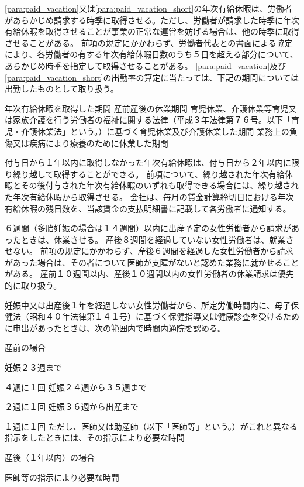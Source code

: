 \documentclass[10pt,a4paper,uplatex]{jsarticle}
\begin{document}
\label{para:paid_vacation_short}
\term
\ref{para:paid_vacation}又は\ref{para:paid_vacation_short}の年次有給休暇は、労働者があらかじめ請求する時季に取得させる。ただし、労働者が請求した時季に年次有給休暇を取得させることが事業の正常な運営を妨げる場合は、他の時季に取得させることがある。
\term
前項の規定にかかわらず、労働者代表との書面による協定により、各労働者の有する年次有給休暇日数のうち５日を超える部分について、あらかじめ時季を指定して取得させることがある。
\term
\ref{para:paid_vacation}及び\ref{para:paid_vacation_short}の出勤率の算定に当たっては、下記の期間については出勤したものとして取り扱う。
\begin{enumerate}
    \itm 年次有給休暇を取得した期間
    \itm 産前産後の休業期間
    \itm 育児休業、介護休業等育児又は家族介護を行う労働者の福祉に関する法律（平成３年法律第７６号。以下「育児・介護休業法」という。）に基づく育児休業及び介護休業した期間
    \itm 業務上の負傷又は疾病により療養のために休業した期間
\end{enumerate}
\term
付与日から１年以内に取得しなかった年次有給休暇は、付与日から２年以内に限り繰り越して取得することができる。
\term
前項について、繰り越された年次有給休暇とその後付与された年次有給休暇のいずれも取得できる場合には、繰り越された年次有給休暇から取得させる。
\term
会社は、毎月の賃金計算締切日における年次有給休暇の残日数を、当該賃金の支払明細書に記載して各労働者に通知する。



６週間（多胎妊娠の場合は１４週間）以内に出産予定の女性労働者から請求があったときは、休業させる。
\term
産後８週間を経過していない女性労働者は、就業させない。
\term
前項の規定にかかわらず、産後６週間を経過した女性労働者から請求があった場合は、その者について医師が支障がないと認めた業務に就かせることがある。
\term
産前１０週間以内、産後１０週間以内の女性労働者の休業請求は優先的に取り扱う。
 

妊娠中又は出産後１年を経過しない女性労働者から、所定労働時間内に、母子保健法（昭和４０年法律第１４１号）に基づく保健指導又は健康診査を受けるために申出があったときは、次の範囲内で時間内通院を認める。
\begin{enumerate}
    \itm 産前の場合
    \begin{enumerate}
        \itm 妊娠２３週まで\par ４週に１回
        \itm 妊娠２４週から３５週まで\par ２週に１回
        \itm 妊娠３６週から出産まで\par １週に１回
        \itm ただし、医師又は助産師（以下「医師等」という。）がこれと異なる指示をしたときには、その指示により必要な時間
    \end{enumerate}
    \itm 産後（１年以内）の場合
    \begin{enumerate}
        \itm 医師等の指示により必要な時間
    \end{enumerate}
\end{enumerate}
\end{document}
